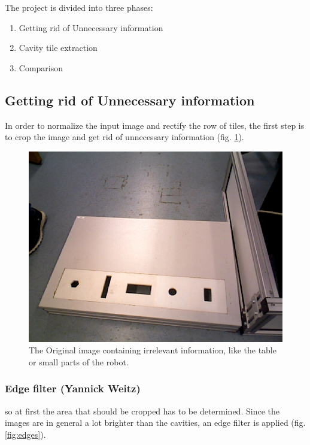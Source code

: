 \documentclass{article}
\begin{document}
The project is divided into three phases: 
\begin{enumerate}
\item Getting rid of Unnecessary information
\item Cavity tile extraction
\item Comparison
\end{enumerate}

\subsection{Getting rid of Unnecessary information}

In order to normalize the input image and rectify the row of tiles, the first step is to crop the image and get rid of unnecessary information (fig. \ref{fig:original}). \\
\begin{figure}[h!]
\centering
\includegraphics[scale=0.3]{images/frame06.jpg}
\caption{The Original image containing irrelevant information, like the table or small parts of the robot.}
\label{fig:original}
\end{figure}

\subsubsection*{Edge filter (Yannick Weitz)}
so at first the area that should be cropped has to be determined. Since the images are in general a lot brighter than the cavities, an edge filter is applied (fig. \ref{fig:edges}).
\end{document}
